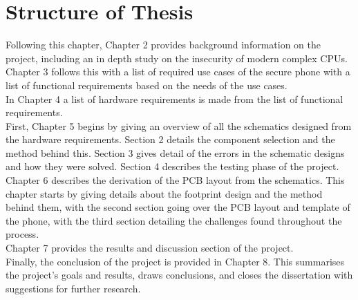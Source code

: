 \section{Structure of Thesis}

Following this chapter, Chapter 2 provides background information on the project, including an in depth study on the insecurity of modern complex CPUs.\\ Chapter 3 follows this with a list of required use cases of the secure phone with a list of functional requirements based on the needs of the use cases.\\ 
In Chapter 4 a list of hardware requirements is made from the list of functional requirements.\\
First, Chapter 5 begins by giving an overview of all the schematics designed from the hardware requirements. Section 2 details the component selection and the method behind this. Section 3 gives detail of the errors in the schematic designs and how they were solved. Section 4 describes the testing phase of the project.\\
Chapter 6 describes the derivation of the PCB layout from the schematics. This chapter starts by giving details about the footprint design and the method behind them, with the second section going over the PCB layout and template of the phone, with the third section detailing the challenges found throughout the process.\\
Chapter 7 provides the results and discussion section of the project.\\
Finally, the conclusion of the project is provided in Chapter 8. This summarises the project's goals and results, draws conclusions, and closes the dissertation with suggestions for further research.
